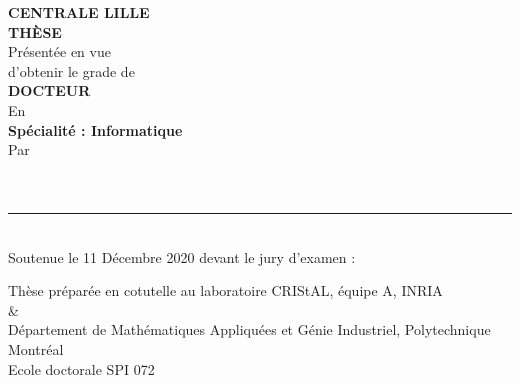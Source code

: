 \frontmatter
\thispagestyle{empty}
\begin{center}
\textbf{CENTRALE LILLE}\\
\vspace*{0.4cm}
\textbf{THÈSE}\\
Présentée en vue\\ d'obtenir le grade de\\
\vspace*{0.6cm}
\textbf{\large DOCTEUR}\\
\vspace*{0.4cm}
En\\
\vspace*{0.4cm}
\textbf{Spécialité : Informatique}\\
Par\\
\vspace*{0.8cm}
{\Large\textbf{\monPrenom~\MakeUppercase{\monNom}}}\\
\vspace*{1cm}
\textbf{\large{\monTitre}}\\
\vspace*{0.8cm}
\textbf{\large{\monTitreFR}}
\par\noindent\rule{0.8\textwidth}{0.4pt}\\
Soutenue le 11 Décembre 2020 devant le jury d'examen :

\monJuryCentrale

Thèse préparée en cotutelle au laboratoire CRIStAL, équipe A, INRIA\\
\&\\
Département de Mathématiques Appliquées et Génie Industriel, Polytechnique Montréal\\
Ecole doctorale SPI 072
\end{center}
